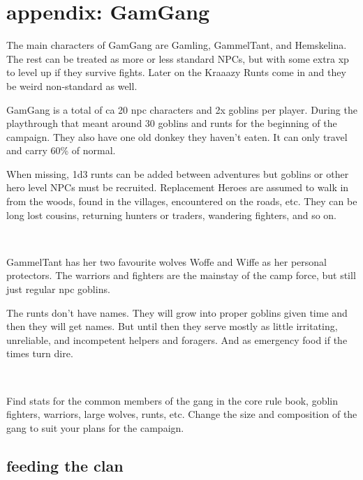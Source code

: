 \clearpage
\section*{appendix: GamGang}

\raggedbottom

The main characters of GamGang are Gamling, GammelTant, and Hemskelina. The rest can be treated as more or less standard NPCs, but with some extra xp to level up if they survive fights. Later on the Kraaazy Runts come in and they be weird non-standard as well.

GamGang is a total of ca 20 npc characters and 2x goblins per player. During the playthrough that meant around 30 goblins and runts for the beginning of the campaign. They also have one old donkey they haven't eaten. It can only travel and carry 60\% of normal.

When missing, 1d3 runts can be added between adventures but goblins or other hero level NPCs must be recruited. Replacement Heroes are assumed to walk in from the woods, found in the villages, encountered on the roads, etc. They can be long lost cousins, returning hunters or traders, wandering fighters, and so on.

\

GammelTant has her two favourite wolves Woffe and Wiffe as her personal protectors.  The warriors and fighters are the mainstay of the camp force, but still just regular npc goblins.

The runts don't have names. They will grow into proper goblins given time and then they will get names. But until then they serve mostly as little irritating, unreliable, and incompetent helpers and foragers. And as emergency food if the times turn dire.

\

Find stats for the common members of the gang in the core rule book, goblin fighters, warriors, large wolves, runts, etc. Change the size and composition of the gang to suit your plans for the campaign.


\subsection*{feeding the clan}


